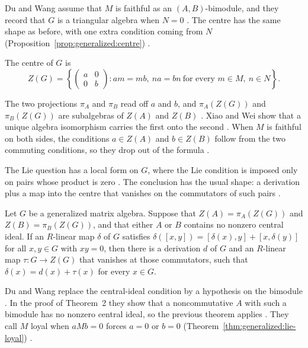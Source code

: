 Du and Wang assume that $M$ is faithful as an $(A,B)$-bimodule, and they record
that $G$ is a triangular algebra when $N=0$ \cite[p.~2720]{DuWang2012}. The centre
has the same shape as before, with one extra condition coming from $N$ (Proposition~\ref{prop:generalized:centre})
\cite[p.~2185]{XiaoWei2010}.\begin{proposition}\label{prop:generalized:centre}
The centre of $G$ is
\[
Z(G)=\left\{\begin{pmatrix} a & 0\\ 0 & b\end{pmatrix}:
am=mb,\ na=bn\ \text{for every } m\in M,\ n\in N\right\}.
\]
\end{proposition}

The two projections $\pi_A$ and $\pi_B$ read off $a$ and $b$, and $\pi_A(Z(G))$
and $\pi_B(Z(G))$ are subalgebras of $Z(A)$ and $Z(B)$
\cite[p.~2185]{XiaoWei2010}. Xiao and Wei show that a unique algebra isomorphism
carries the first onto the second \cite[Lemma~3.2, p.~2185]{XiaoWei2010}. When $M$
is faithful on both sides, the conditions $a\in Z(A)$ and $b\in Z(B)$ follow from
the two commuting conditions, so they drop out of the formula
\cite[p.~2185]{XiaoWei2010}.

The Lie question has a local form on $G$, where the Lie condition is imposed only
on pairs whose product is zero \cite[Theorem~1, pp.~2720--2721]{DuWang2012}. The
conclusion has the usual shape: a derivation plus a map into the centre that
vanishes on the commutators of such pairs \cite[p.~2721]{DuWang2012}.

\begin{theorem}\label{thm:generalized:lie-local}
Let $G$ be a generalized matrix algebra. Suppose that $Z(A)=\pi_A(Z(G))$ and
$Z(B)=\pi_B(Z(G))$, and that either $A$ or $B$ contains no nonzero central ideal.
If an $R$-linear map $\delta$ of $G$ satisfies
$\delta([x,y])=[\delta(x),y]+[x,\delta(y)]$ for all $x,y\in G$ with $xy=0$, then
there is a derivation $d$ of $G$ and an $R$-linear map
$\tau\colon G\to Z(G)$ that vanishes at those commutators, such that
$\delta(x)=d(x)+\tau(x)$ for every $x\in G$.
\end{theorem}

Du and Wang replace the central-ideal condition by a hypothesis on the bimodule
\cite[p.~2725]{DuWang2012}. In the proof of Theorem~2 they show that a
noncommutative $A$ with such a bimodule has no nonzero central ideal, so the
previous theorem applies \cite[p.~2725]{DuWang2012}. They call $M$ loyal when
$aMb=0$ forces $a=0$ or $b=0$ (Theorem~\ref{thm:generalized:lie-loyal}) \cite[p.~2725]{DuWang2012}.

